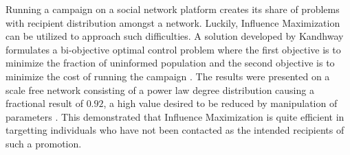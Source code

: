 \documentclass[12pt]{article}
\begin{document}
Running a campaign on a social network platform creates its share of problems with recipient distribution amongst a network. 
Luckily, Influence Maximization can be utilized to approach such difficulties. 
A solution developed by Kandhway formulates a bi-objective optimal control problem where the first objective is to minimize the fraction of uninformed population and the second objective is to minimize the cost of running the campaign \cite{10035644}. 
The results were presented on a scale free network consisting of a power law degree distribution causing a fractional result of $0.92$, a high value desired to be reduced by manipulation of parameters \cite{10035644}. 
This demonstrated that Influence Maximization is quite efficient in targetting individuals who have not been contacted as the intended recipients of such a promotion.



\begin{thebibliography}{99}
\nocite{*}

\end{thebibliography}
\end{document}
